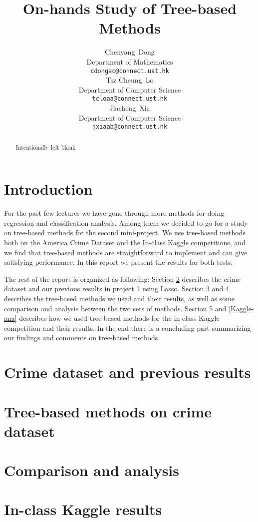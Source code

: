 \documentclass{article}
\title{On-hands Study of Tree-based Methods}
\author{
  Chenyang~Dong\\
  Department of Mathematics\\
  \texttt{cdongac@connect.ust.hk} \\
  \And
  Tsz Cheung~Lo\\
   Department of Computer Science\\
  \texttt{tcloaa@connect.ust.hk} \\
  \And
  Jiacheng~Xia\\
   Department of Computer Science\\
  \texttt{jxiaab@connect.ust.hk} \\
}
\begin{document}

\maketitle

\begin{abstract}
Intentionally left blank
\end{abstract}

\section{Introduction}
For the past few lectures we have gone through more methods for doing regression and classification analysis. Among them we decided to go for a study on tree-based methods for the second mini-project. We use tree-based methods both on the America Crime Dataset and the In-class Kaggle competitions, and we find that tree-based methods are straightforward to implement and can give satisfying performance. In this report we present the results for both tests.

The rest of the report is organized as following: Section \ref{crime-Lasso} describes the crime dataset and our previous results in project 1 using Lasso. Section \ref{crime-tree} and \ref{crime-cmp} describes the tree-based methods we used and their results, as well as some comparison and analysis between the two sets of methods. Section \ref{Kaggle-res} and \ref{Kaggle-ana} describes how we used tree-based methods for the in-class Kaggle competition and their results. In the end there is a concluding part summarizing our findings and comments on tree-based methods.
\section{Crime dataset and previous results}
\label{crime-Lasso}

\section{Tree-based methods on crime dataset}
\label{crime-tree}

\section{Comparison and analysis}
\label{crime-cmp}

\section{In-class Kaggle results}
\label{Kaggle-res}
\end{document}
